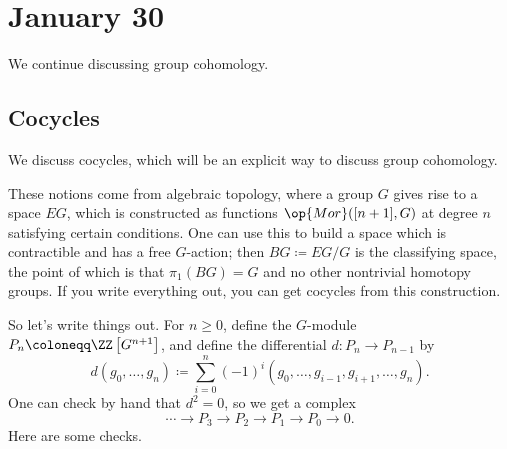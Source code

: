 \documentclass[../notes.tex]{subfiles}
\begin{document}
\section{January 30}

We continue discussing group cohomology.

\subsection{Cocycles}
We discuss cocycles, which will be an explicit way to discuss group cohomology.
\begin{remark}
	These notions come from algebraic topology, where a group $G$ gives rise to a space $EG$, which is constructed as functions $\op{Mor}([n+1],G)$ at degree $n$ satisfying certain conditions. One can use this to build a space which is contractible and has a free $G$-action; then $BG\coloneqq EG/G$ is the classifying space, the point of which is that $\pi_1(BG)=G$ and no other nontrivial homotopy groups. If you write everything out, you can get cocycles from this construction.
\end{remark}
So let's write things out. For $n\ge0$, define the $G$-module $P_n\coloneqq\ZZ\left[G^{n+1}\right]$, and define the differential $d\colon P_n\to P_{n-1}$ by
\[d(g_0,\ldots,g_n)\coloneqq\sum_{i=0}^n(-1)^i(g_0,\ldots,g_{i-1},g_{i+1},\ldots,g_n).\]
One can check by hand that $d^2=0$, so we get a complex
\[\cdots\to P_3\to P_2\to P_1\to P_0\to0.\]
Here are some checks.
\end{document}
